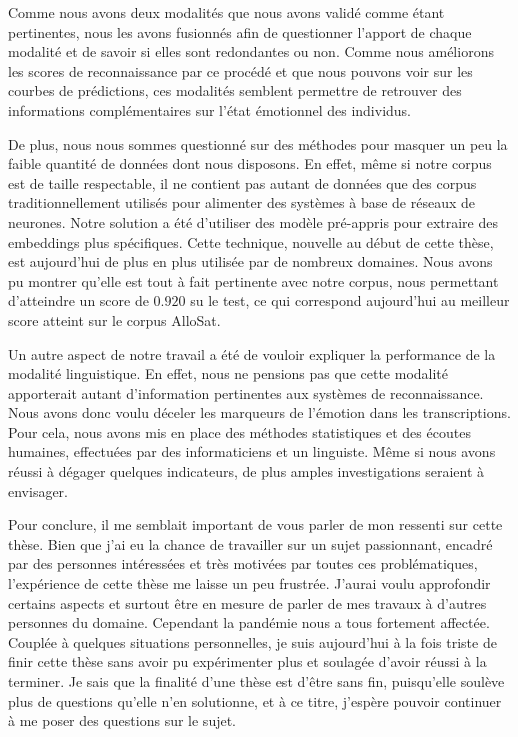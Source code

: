 Comme nous avons deux modalités que nous avons validé comme étant pertinentes, nous les avons fusionnés afin de questionner l'apport de chaque modalité et de savoir si elles sont redondantes ou non. Comme nous améliorons les scores de reconnaissance par ce procédé et que nous pouvons voir sur les courbes de prédictions, ces modalités semblent permettre de retrouver des informations complémentaires sur l'état émotionnel des individus.

De plus, nous nous sommes questionné sur des méthodes pour masquer un peu la faible quantité de données dont nous disposons. En effet, même si notre corpus est de taille respectable, il ne contient pas autant de données que des corpus traditionnellement utilisés pour alimenter des systèmes à base de réseaux de neurones. Notre solution a été d'utiliser des modèle pré-appris pour extraire des embeddings plus spécifiques. Cette technique, nouvelle au début de cette thèse, est aujourd'hui de plus en plus utilisée par de nombreux domaines. Nous avons pu montrer qu'elle est tout à fait pertinente avec notre corpus, nous permettant d’atteindre un score de $0.920$ su le test, ce qui correspond aujourd'hui au meilleur score atteint sur le corpus AlloSat.

Un autre aspect de notre travail a été de vouloir expliquer la performance de la modalité linguistique. En effet, nous ne pensions pas que cette modalité apporterait autant d'information pertinentes aux systèmes de reconnaissance. Nous avons donc voulu déceler les marqueurs de l'émotion dans les transcriptions. Pour cela, nous avons mis en place des méthodes statistiques et des écoutes humaines, effectuées par des informaticiens et un linguiste. Même si nous avons réussi à dégager quelques indicateurs, de plus amples investigations seraient à envisager.

Pour conclure, il me semblait important de vous parler de mon ressenti sur cette thèse. Bien que j'ai eu la chance de travailler sur un sujet passionnant, encadré par des personnes intéressées et très motivées par toutes ces problématiques, l'expérience de cette thèse me laisse un peu frustrée. J'aurai voulu approfondir certains aspects et surtout être en mesure de parler de mes travaux à d'autres personnes du domaine. Cependant la pandémie nous a tous fortement affectée. Couplée à quelques situations personnelles, je suis aujourd'hui à la fois triste de finir cette thèse sans avoir pu expérimenter plus et soulagée d'avoir réussi à la terminer. Je sais que la finalité d'une thèse est d'être sans fin, puisqu'elle soulève plus de questions qu'elle n'en solutionne, et à ce titre, j'espère pouvoir continuer à me poser des questions sur le sujet.

